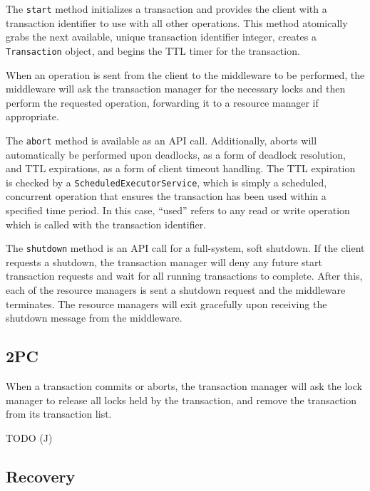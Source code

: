 \documentclass[11pt]{article}
\begin{document}
The \texttt{start} method initializes a transaction and provides the client with a transaction identifier to use with all other operations. This method atomically grabs the next available, unique transaction identifier integer, creates a \texttt{Transaction} object, and begins the TTL timer for the transaction. \par

When an operation is sent from the client to the middleware to be performed, the middleware will ask the transaction manager for the necessary locks and then perform the requested operation, forwarding it to a resource manager if appropriate.

The \texttt{abort} method is available as an API call. Additionally, aborts will automatically be performed upon deadlocks, as a form of deadlock resolution, and TTL expirations, as a form of client timeout handling. The TTL expiration is checked by a \texttt{ScheduledExecutorService}, which is simply a scheduled, concurrent operation that ensures the transaction has been used within a specified time period. In this case, ``used'' refers to any read or write operation which is called with the transaction identifier.  \par

The \texttt{shutdown} method is an API call for a full-system, soft shutdown. If the client requests a shutdown, the transaction manager will deny any future start transaction requests and wait for all running transactions to complete. After this, each of the resource managers is sent a shutdown request and the middleware terminates. The resource managers will exit gracefully upon receiving the shutdown message from the middleware. \par

\subsection*{2PC}

When a transaction commits or aborts, the transaction manager will ask the lock manager to release all locks held by the transaction, and remove the transaction from its transaction list. \par

TODO (J)

\subsection*{Recovery}
\end{document}
